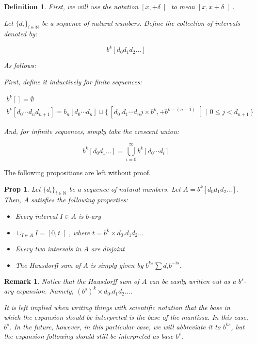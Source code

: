 \documentclass[11pt]{amsart}
\newcommand{\N}{\mathbb{N}}
\newtheorem{prop}{Prop}
\newtheorem{definition}{Definition}
\newtheorem{remark}{Remark}
\begin{document}
\begin{definition}
First, we will use the notation $\left[ x, +\delta \right[$ to mean $\left[x, x+\delta \right[$.

Let $\{d_i\}_{i \in \N}$ be a sequence of natural numbers. Define the collection of intervals denoted by:

\[ b^k [d_0 d_1 d_2 \dots] \]

As follows:

First, define it inductively for finite sequences:

\begin{gather*}
b^k [] = \emptyset\\
b^k [d_0 \cdots d_n d_{n+1}] = b_n [d_0 \cdots d_n] \cup \{\,\left[d_0 . d_1 \cdots d_n j \times b^k, +b^{k-(n+1)} \right[ \mid 0 \leq j < d_{n+1} \,\}
\end{gather*}

And, for infinite sequences, simply take the crescent union:

\[ b^k[d_0 d_1 \dots] = \bigcup_{i = 0}^\infty b^k[d_0 \cdots d_i] \]

\end{definition}

The following propositions are left without proof.

\begin{prop}
Let $\{d_i\}_{i \in \N}$ be a sequence of natural numbers. Let $A = b^k [d_0 d_1 d_2 \dots]$. Then, $A$ satisfies the following properties:

\begin{itemize}
\item Every interval $I \in A$ is $b$-ary

\item $\cup_{I \in A} I = \left[ 0, t \right[$, where $t = b^k \times d_0 . d_1 d_2 \dots$

\item Every two intervals in $A$ are disjoint

\item The Hausdorff sum of $A$ is simply given by $b^{ks} \sum d_i b^{-is}$.
\end{itemize}

\end{prop}

\begin{remark}
Notice that the Hausdorff sum of $A$ can be easily written out as a $b^s$-ary expansion. Namely, $(b^s)^k \times d_0 . d_1 d_ 2 \dots$.

It is left implied when writing things with scientific notation that the base in which the expansion should be interpreted is the base of the mantissa. In this case, $b^s$. In the future, however, in this particular case, we will abbreviate it to $b^{ks}$, but the expansion following should still be interpreted as base $b^s$.
\end{remark}
\end{document}
